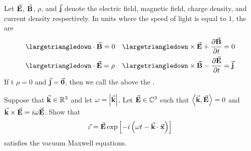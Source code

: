 \begin{dfn}
    Let \( \va{E} \), \( \va{B} \), \( \rho \), and \( \va{j} \) denote the electric field, magnetic field, charge density, and current density respectively. In units where the speed of light is equal to \( 1 \), the  are 
    \begin{align*}
        &\largetriangledown \cdot \va{B} = 0 && \largetriangledown \times \va{E} + \pdv{\va{B}}{t} = 0 \\
        &\largetriangledown \cdot \va{E} = \rho &&\largetriangledown \times \va{B} - \pdv{\va{E}}{t} = \va{j}
    \end{align*}
     If t \( \rho = 0 \) and \( \va{j}= \va{0} \), then we call the above the .
\end{dfn}

\begin{exercise}
    Suppose that \( \va{k} \in \mathbb{R}^{3} \) and let \( \omega = \abs{\va{k}} \). Let \( \va{E} \in \mathbb{C}^{3} \) such that \( \left< \va{k}, \va{E} \right> = 0 \) and \( \va{k} \times \va{E} = i \omega \va{E} \). Show that 
    \[ \va{\varepsilon} = \va{E} \exp \left[ -i \left( \omega t - \va{k} \cdot \va{x} \right)\right]\]
    satisfies the vacuum Maxwell equations.
\end{exercise}
\begin{solution}
    
\end{solution}
